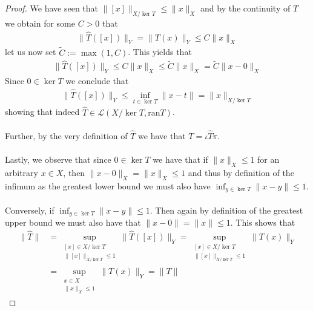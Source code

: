 \documentclass[12pt,a4paper]{article}
\theoremstyle{definition}
\begin{document}
\begin{proof}
\newpage
We have seen that $\|[x]\|_{X/\ker T} \leq \|x\|_X$ and by the continuity of $T$ we obtain for some $C>0$ that
\begin{align*}
\| \hat{T}([x])\|_Y = \| T(x)\|_Y \leq C \|x\|_X
\end{align*}
let us now set $\tilde{C}:= \max (1, C)$. This yields that
\begin{align*}
\| \hat{T}([x])\|_Y \leq C\|x\|_X \leq \tilde{C}\|x\|_X = \tilde{C} \|x-0\|_X
\end{align*}
Since $0 \in \ker T$ we conclude that
\begin{align*}
\| \hat{T}([x]) \|_Y \leq \inf_{t \in \ker T} \| x-t\| = \|x\|_{X/\ker T}
\end{align*}
showing that indeed $\hat{T} \in \mathcal{L}(X/ \ker T, \text{ran}T)$. \\
\\
Further, by the very definition of $ \hat{T}$ we have that $T= \iota \hat{T} \pi$. 
\\\\
Lastly, we observe that since $0 \in \ker T$ we have that if $\|x\|_X \leq 1$ for an arbitrary $x \in X$, then $\|x-0\|_X=\|x\|_X \leq 1$ and thus by definition of the infimum as the greatest lower bound we must also have $\inf_{y \in \ker T} \|x-y\| \leq 1$.
\\\\
Conversely, if $\inf_{y \in \ker T} \|x-y \| \leq 1$. Then again by definition of the greatest upper bound we must also have that $\|x-0\|=\|x\| \leq 1$. This shows that
\begin{align*}
\| \hat{T}\| &= \sup_{ \substack{ [x] \in X/ \ker T \\ \| [x]\|_{X / \ker T} \leq 1}} \| \hat{T}([x])\|_Y = \sup_{ \substack{ [x] \in X/ \ker T \\ \| [x]\|_{X / \ker T} \leq 1}} \| T(x)\|_Y \\
& = \sup_{\substack{ x \in X \\ \|x\|_X \leq 1 }} \| T(x)\|_Y = \|T\|
\end{align*}
\end{proof}
\end{document}
